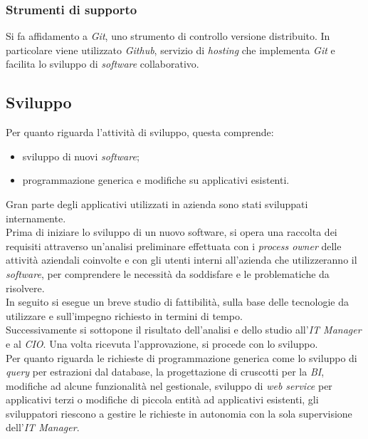 
\subsubsection{Strumenti di supporto}
Si fa affidamento a \textit{Git}, uno strumento di controllo versione distribuito. In particolare viene utilizzato \textit{Github}, servizio di \textit{hosting} che implementa \textit{Git} e facilita lo sviluppo di \textit{software} collaborativo.


\subsection{Sviluppo}

Per quanto riguarda l'attività di sviluppo, questa comprende: 
\begin{itemize}
	\item sviluppo di nuovi \textit{software}; 
	\item programmazione generica e modifiche su applicativi esistenti.
\end{itemize}
Gran parte degli applicativi utilizzati in azienda sono stati sviluppati internamente.\\
Prima di iniziare lo sviluppo di un nuovo software, si opera una raccolta dei requisiti attraverso un'analisi preliminare effettuata con i \textit{process owner} delle attività aziendali coinvolte e con gli utenti interni all'azienda che utilizzeranno il \textit{software}, per comprendere le necessità da soddisfare e le problematiche da risolvere.\\
In seguito si esegue un breve studio di fattibilità, sulla base delle tecnologie da utilizzare e sull'impegno richiesto in termini di tempo.\\
Successivamente si sottopone il risultato dell'analisi e dello studio all'\textit{IT Manager} e al \textit{CIO}. Una volta ricevuta l'approvazione, si procede con lo sviluppo.\\ 
Per quanto riguarda le richieste di programmazione generica come lo sviluppo di \textit{query} per estrazioni dal database, la progettazione di cruscotti per la \textit{BI}, modifiche ad alcune funzionalità nel gestionale, sviluppo di \textit{web service} per applicativi terzi o modifiche di piccola entità ad applicativi esistenti, gli sviluppatori riescono a gestire le richieste in autonomia con la sola supervisione dell'\textit{IT Manager}.


